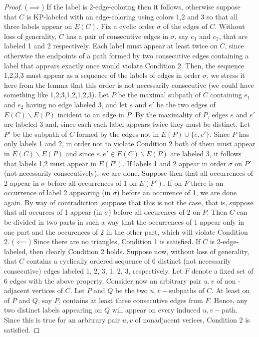 \documentclass[12pt,a4paper,titlepage,openany]{report}
\begin{document}
\begin{proof}
($\implies$) If the label is 2-edge-coloring then it follows, otherwise suppose that $C$ is KP-labeled with an edge-coloring using colors 1,2 and 3 so that all three labels appear on $E(C)$. Fix a cyclic order $\sigma$ of the edges of $C$. Without loss of generality, $C$ has a pair of consecutive edges in $\sigma$, say $e_1$ and $e_2$, that are labeled 1 and 2 respectively. Each label must appear at least twice on $C$, since otherwise the endpoints of a path formed by two consecutive edges containing a label that appears exactly once would violate Condition 2. Then, the sequence 1,2,3,3 must appear as a sequence of the labels of edges in order $\sigma$, we stress it here from the lemma that this order is not necessarily consecutive (we could have something like 1,2,3,1,2,1,2,3). Let $P$ be the maximal subpath of $C$ containing $e_1$ and $e_2$ having no edge labeled 3, and let $e$ and $e'$ be the two edges of $E(C)\backslash E(P)$ incident to an edge in $P$. By the maximality of $P$, edges $e$ and $e'$ are labeled 3 and, since each each label appears twice they must be distinct. Let $P'$ be the subpath of $C$ formed by the edges not in $E(P)\cup \{ e,e'\}$. Since $P$ has only labels 1 and 2, in order not to violate Condition 2 both of them must appear in $E(C)\backslash E(P)$ and since $e,e' \in E(C)\backslash E(P)$ are labeled 3, it follows that labels 1,2 must appear in $E(P')$. If labels 1 and 2 appear in order $\sigma$ on $P'$ (not necessarily consecutively), we are done. Suppose then that all occurrences of 2 appear in $\sigma$ before all occurrences of 1 on $E(P')$. If on $P$ there is an occurrence of label 2 appearing (in $\sigma$) before an occurence of 1, we are done again. By way of contradiction  ,suppose that this is not the case, that is, suppose that all occurces of 1 appear (in $\sigma$) before all occurences of 2 on $P$. \newline
Then $C$ can be divided in two parts in such a way that the occurrences of 1 appear only in one part and the occurences of 2 in the other part, which will violate Condition 2.\newline
($\impliedby$) Since there are no triangles, Condition 1 is satisfied. \newline
If $C$ is 2-edge-labeled, then clearly Condition 2 holds.\newline
Suppose now, without loss of generality, that $C$ contains a cyclically ordered sequence of 6 distinct (not necessarily consecutive) edges labeled 1, 2, 3, 1, 2, 3, respectively. Let $F$ denote a fixed set of 6 edges with the above property. Consider now an arbitrary pair $u,v$ of non -adjacent vertices of $C$. Let $P$ and $Q$ be the two $u,v-$subpaths of $C$. At least on of $P$ and $Q$, say $P$, contains at least three consecutive edges from $F$. Hence, any two distinct labels appearing on $Q$ will appear on every induced $u,v-$path. Since this is true for an arbitrary pair $u,v$ of nonadjacent verices, Condition 2 is satisfied.


\end{proof}
\end{document}
